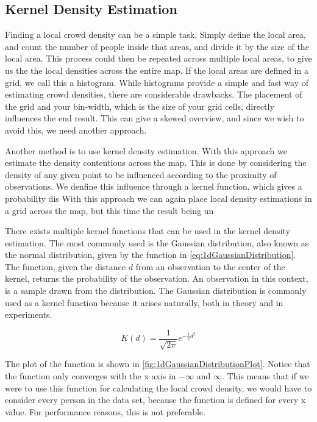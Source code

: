 \subsection{Kernel Density Estimation}
\label{sub:kernelDensityEstimation}

Finding a local crowd density can be a simple task. Simply define the local area, and count the number of people inside that areas, and divide it by the size of the local area. This process could then be repeated across multiple local areas, to give us the the local densities across the entire map. If the local areas are defined in a grid, we call this a histogram. While histograms provide a simple and fast way of estimating crowd densities, there are considerable drawbacks. The placement of the grid and your bin-width, which is the size of your grid cells, directly influences the end result\cite{histogramDrawbacks}. This can give a skewed overview, and since we wish to avoid this, we need another approach.

Another method is to use kernel density estimation. With this approach we estimate the density contentious across the map. This is done by considering the density of any given point to be influenced according to the proximity of observations. We denfine this influence through a kernel function, which gives a probability dis
With this approach we can again place local density estimations in a grid across the map, but this time the result being un


There exists multiple kernel functions that can be used in the kernel density estimation. The most commonly used is the Gaussian distribution, also known as the normal distribution, given by the function in \cref{eq:1dGaussianDistribution}. The function, given the distance $d$ from an observation to the center of the kernel, returns the probability of the observation. An observation in this context, is a sample drawn from the distribution. The Gaussian distribution is commonly used as a kernel function because it arises naturally, both in theory and in experiments.

\begin{equation}
\label{eq:1dGaussianDistribution}
K(d) = \frac{1}{\sqrt{2\pi}} e^{-\frac{1}{2} d^2}
\end{equation}

The plot of the function is shown in \cref{fig:1dGaussianDistributionPlot}. Notice that the function only converges with the x axis in $-\infty$ and $\infty$. This means that if we were to use this function for calculating the local crowd density, we would have to consider every person in the data set, because the function is defined for every x value. For performance reasons, this is not preferable.

